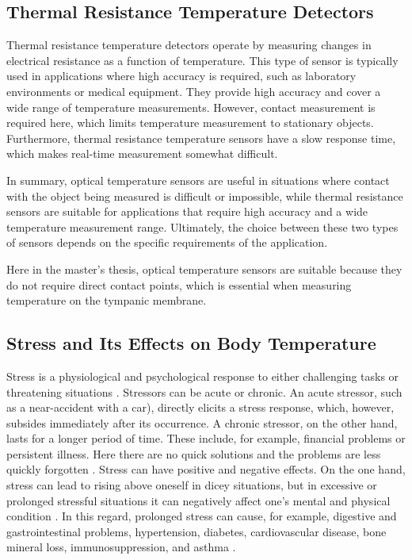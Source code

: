 \subsection{Thermal Resistance Temperature Detectors}
\label{Background:TemperatureSensors:ResistanceTD}
Thermal resistance temperature detectors operate by measuring changes in electrical resistance as a function of temperature. 
This type of sensor is typically used in applications where high accuracy is required, such as laboratory environments or medical equipment.
They provide high accuracy and cover a wide range of temperature measurements.
However, contact measurement is required here, which limits temperature measurement to stationary objects.
Furthermore, thermal resistance temperature sensors have a slow response time, which makes real-time measurement somewhat difficult.

In summary, optical temperature sensors are useful in situations where contact with the object being measured is difficult or impossible, while thermal resistance sensors are suitable for applications that require high accuracy and a wide temperature measurement range. 
Ultimately, the choice between these two types of sensors depends on the specific requirements of the application.

Here in the master's thesis, optical temperature sensors are suitable because they do not require direct contact points, which is essential when measuring temperature on the tympanic membrane.

\subsection{Stress and Its Effects on Body Temperature}
Stress is a physiological and psychological response to either challenging tasks or threatening situations \cite{jamesUnderstandingRelationshipsPhysiological2023}. 
Stressors can be acute or chronic.
An acute stressor, such as a near-accident with a car), directly elicits a stress response, which, however, subsides immediately after its occurrence.
A chronic stressor, on the other hand, lasts for a longer period of time. 
These include, for example, financial problems or persistent illness.
Here there are no quick solutions and the problems are less quickly forgotten \cite{baumControlIntrusiveMemories1993}.
Stress can have positive and negative effects.
On the one hand, stress can lead to rising above oneself in dicey situations, but in excessive or prolonged stressful situations it can negatively affect one's mental and physical condition \cite{jamesUnderstandingRelationshipsPhysiological2023}.
In this regard, prolonged stress can cause, for example, digestive and gastrointestinal problems, hypertension, diabetes, cardiovascular disease, bone mineral loss, immunosuppression, and asthma \cite{merabetHowExposureChronic2022, dhamaBiomarkersStressRelated2019, petriePrevalencePTSDCommon2018}.

